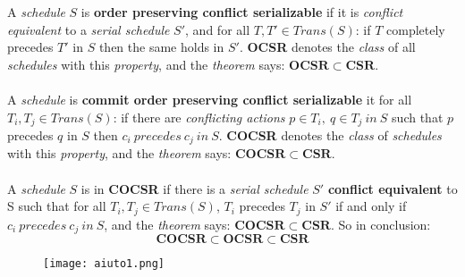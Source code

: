 \documentclass{article}
\begin{document}
A \emph{schedule} $S$ is \textbf{order preserving conflict serializable} if it is \emph{conflict equivalent }to a \emph{serial schedule} $S'$, and for all $T, T' \in Trans(S)$: if $T$ completely precedes $T'$ in $S$ then the same holds in $S'$. \textbf{OCSR} denotes the \emph{class} of all \emph{schedules} with this \emph{property}, and the \emph{theorem} says: $\mathbf{OCSR \subset CSR}$. \\\\
A \emph{schedule} is \textbf{commit order preserving conflict serializable} it for all $T_i, T_j \in Trans(S)$: if there are \emph{conflicting actions} $p \in T_i,\ q \in T_j\ in\ S$ such that $p$ precedes $q$ in $S$ then $c_i\ precedes\ c_j\ in\ S$. \textbf{COCSR} denotes the \emph{class} of \emph{schedules} with this \emph{property}, and the \emph{theorem} says: $\mathbf{COCSR \subset CSR}$.\\\\
A \emph{schedule} $S$ is in \textbf{COCSR} if there is a \emph{serial schedule} $S'$ \textbf{conflict equivalent} to S such that for all $T_i, T_j \in Trans(S)$, $T_i$ precedes $T_j$ in $S'$ if and only if $c_i\ precedes\ c_j\ in\ S$, and the \emph{theorem} says: $\mathbf{COCSR \subset CSR}$. So in conclusion: \[\mathbf{COCSR \subset OCSR \subset CSR}\]
\begin{figure}[H]
  \centering
  \texttt{[image: aiuto1.png]}
\end{figure}
\clearpage
\end{document}
